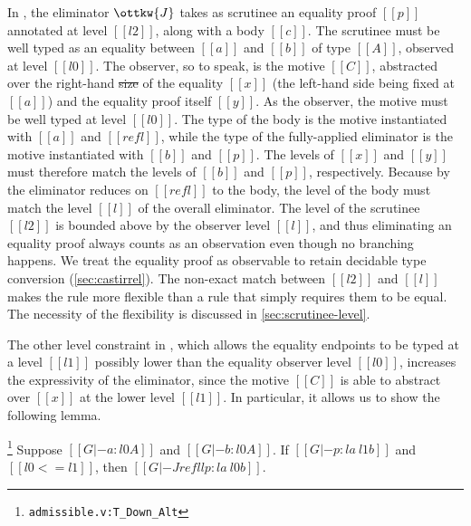 \documentclass[acmsmall, screen=true, nonacm=true,
  review=\ifpublic false\else true\fi,
  anonymous=\ifanonymous true\else false\fi
]{acmart}
\newcommand{\sw}[1]{}
\newcommand{\suppl}[3]{{\scriptsize\texttt{#2:#3}}}
\newlength{\punctwidth}
\newcommand{\stack}[1]{%
  \settowidth{\punctwidth}{#1}%
  \hspace*{-\the\punctwidth}%
}
\providecommand{\DIFadd}[1]{{\protect\color{blue}\uwave{#1}}} %
\providecommand{\DIFdel}[1]{{\protect\color{red}\sout{#1}}}                      %
\providecommand{\DIFaddbegin}{} %
\providecommand{\DIFaddend}{} %
\providecommand{\DIFdelbegin}{} %
\providecommand{\DIFdelend}{} %
\begin{document}
In , the eliminator $\ottkw{J}$ takes as scrutinee
an equality proof $[[p]]$ annotated at level $[[l2]]$,
along with a body $[[c]]$.
The scrutinee must be well typed as an equality between $[[a]]$ and $[[b]]$
of type $[[A]]$, observed at level $[[l0]]$.
The observer, so to speak, is the motive $[[C]]$,
abstracted over the right-hand \DIFdelbegin \DIFdel{size }\DIFdelend \DIFaddbegin \DIFadd{side }\DIFaddend of the equality $[[x]]$
(the left-hand side being fixed at $[[a]]$)
and the equality proof itself $[[y]]$.
As the observer, the motive must be well typed at level $[[l0]]$.
The type of the body is the motive instantiated with $[[a]]$ and $[[refl]]$,
while the type of the fully-applied eliminator is the motive instantiated with $[[b]]$ and $[[p]]$.
The levels of $[[x]]$ and $[[y]]$ must therefore match the levels of $[[b]]$ and $[[p]]$, respectively.
Because by  the eliminator reduces on $[[refl]]$ to the body,
the level of the body must match the level $[[l]]$ of the overall
eliminator.
The level of the scrutinee $[[l2]]$ is bounded above by the observer
level $[[l]]$, and thus
eliminating an equality proof always counts as an observation even
though no branching happens. We treat the equality proof as observable
to retain decidable type conversion (\cref{sec:castirrel}).
The non-exact match between $[[l2]]$ and $[[l]]$ makes the
rule more flexible than a rule that simply requires them to be
equal. The necessity of the flexibility is discussed in
\cref{sec:scrutinee-level}.



The other level constraint in ,
which allows the equality endpoints to be typed at a level $[[l1]]$
possibly lower than the equality observer level $[[l0]]$,
increases the expressivity of the eliminator,
since the motive $[[C]]$ is able to abstract over $[[x]]$ at the lower level $[[l1]]$.
In particular, it allows us to show the following lemma.

\begin{lemma}[Downgrade]
  \stack{.~}\footnote{\suppl{theories}{admissible.v}{T\_Down\_Alt}}
  \label{lem:downgrade}
  Suppose $[[G |- a : l0 A]]$ and $[[G |- b : l0 A]]$.
  If $[[G |- p : l a ~ l1 b]]$ and $[[l0 <= l1]]$,
  then $[[G |- J refl l p : l a ~ l0 b]]$.
\end{lemma}
\end{document}
